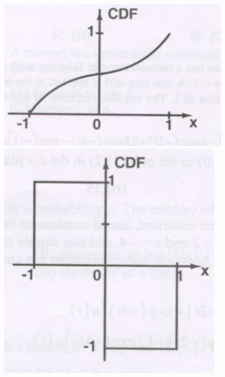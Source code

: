 \documentclass[a4paper, 11pt]{article}
\begin{document}
\begin{enumerate}
\begin{figure}[H]
\begin{minipage}{0.45\textwidth}
            \centerline{}
        \end{minipage}
        \vfill
        \begin{minipage}{0.45\textwidth}
            \centering
            \includegraphics[width=0.8\columnwidth]{figs/q24C.png}
            \centerline{}
        \end{minipage}
        \hfill
        \begin{minipage}{0.45\textwidth}
            \centering
            \includegraphics[width=0.8\columnwidth]{figs/q24D.png}
            \centerline{}
        \end{minipage}
        \caption*{}
        \label{fig:q24_options}
    \end{figure}

    \hfill{}


\end{enumerate}
\end{document}
